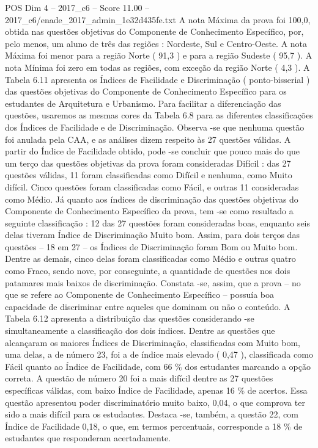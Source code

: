 \begin{textsample}{POS Dim 4 – 2017\_c6 – Score 11.00 – 2017\_c6/enade\_2017\_admin\_1e32d435fe.txt}
A nota Máxima da prova foi 100,0, obtida nas questões objetivas do Componente de Conhecimento Específico, por, pelo menos, um aluno de três das regiões : Nordeste, Sul e Centro-Oeste.
A nota Máxima foi menor para a região Norte ( 91,3 ) e para a região Sudeste ( 95,7 ).
A nota Mínima foi zero em todas as regiões, com exceção da região Norte ( 4,3 ).
A Tabela 6.11 apresenta os Índices de Facilidade e Discriminação ( ponto-bisserial ) das questões objetivas do Componente de Conhecimento Específico para os estudantes de Arquitetura e Urbanismo.
Para facilitar a diferenciação das questões, usaremos as mesmas cores da Tabela 6.8 para as diferentes classificações dos Índices de Facilidade e de Discriminação.
Observa -se que nenhuma questão foi anulada pela CAA, e as análises dizem respeito às 27 questões válidas.
A partir do Índice de Facilidade obtido, pode -se concluir que pouco mais do que um terço das questões objetivas da prova foram consideradas Difícil : das 27 questões válidas, 11 foram classificadas como Difícil e nenhuma, como Muito difícil.
Cinco questões foram classificadas como Fácil, e outras 11 consideradas como Médio.
Já quanto aos índices de discriminação das questões objetivas do Componente de Conhecimento Específico da prova, tem -se como resultado a seguinte classificação : 12 das 27 questões foram consideradas boas, enquanto seis delas tiveram Índice de Discriminação Muito bom.
Assim, para dois terços das questões – 18 em 27 – os Índices de Discriminação foram Bom ou Muito bom.
Dentre as demais, cinco delas foram classificadas como Médio e outras quatro como Fraco, sendo nove, por conseguinte, a quantidade de questões nos dois patamares mais baixos de discriminação.
Constata -se, assim, que a prova – no que se refere ao Componente de Conhecimento Específico – possuía boa capacidade de discriminar entre aqueles que dominam ou não o conteúdo.
A Tabela 6.12 apresenta a distribuição das questões considerando -se simultaneamente a classificação dos dois índices.
Dentre as questões que alcançaram os maiores Índices de Discriminação, classificadas com Muito bom, uma delas, a de número 23, foi a de índice mais elevado ( 0,47 ), classificada como Fácil quanto ao Índice de Facilidade, com 66 \% dos estudantes marcando a opção correta.
A questão de número 20 foi a mais difícil dentre as 27 questões específicas válidas, com baixo Índice de Facilidade, apenas 16 \% de acertos.
Essa questão apresentou poder discriminatório muito baixo, 0,04, o que comprova ter sido a mais difícil para os estudantes.
Destaca -se, também, a questão 22, com Índice de Facilidade 0,18, o que, em termos percentuais, corresponde a 18 \% de estudantes que responderam acertadamente.

\end{textsample}
